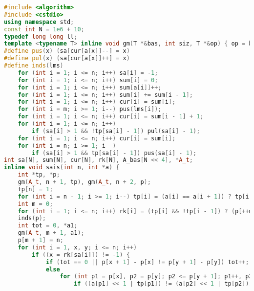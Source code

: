 \documentclass[9pt, a4paper, oneside]{book}
\begin{document}
\begin{lstlisting}[language={C++}]
#include <algorithm>
#include <cstdio>
using namespace std;
const int N = 1e6 + 10;
typedef long long ll;
template <typename T> inline void gm(T *&bas, int siz, T *&op) { op = bas, bas += siz; }
#define pus(x) (sa[cur[a[x]]--] = x)
#define pul(x) (sa[cur[a[x]]++] = x)
#define inds(lms)                                                                                                      \
    for (int i = 1; i <= n; i++) sa[i] = -1;                                                                           \
    for (int i = 1; i <= n; i++) sum[i] = 0;                                                                           \
    for (int i = 1; i <= n; i++) sum[a[i]]++;                                                                          \
    for (int i = 1; i <= n; i++) sum[i] += sum[i - 1];                                                                 \
    for (int i = 1; i <= n; i++) cur[i] = sum[i];                                                                      \
    for (int i = m; i >= 1; i--) pus(lms[i]);                                                                          \
    for (int i = 1; i <= n; i++) cur[i] = sum[i - 1] + 1;                                                              \
    for (int i = 1; i <= n; i++)                                                                                       \
        if (sa[i] > 1 && !tp[sa[i] - 1]) pul(sa[i] - 1);                                                               \
    for (int i = 1; i <= n; i++) cur[i] = sum[i];                                                                      \
    for (int i = n; i >= 1; i--)                                                                                       \
        if (sa[i] > 1 && tp[sa[i] - 1]) pus(sa[i] - 1);
int sa[N], sum[N], cur[N], rk[N], A_bas[N << 4], *A_t;
inline void sais(int n, int *a) {
    int *tp, *p;
    gm(A_t, n + 1, tp), gm(A_t, n + 2, p);
    tp[n] = 1;
    for (int i = n - 1; i >= 1; i--) tp[i] = (a[i] == a[i + 1]) ? tp[i + 1] : (a[i] < a[i + 1]);
    int m = 0;
    for (int i = 1; i <= n; i++) rk[i] = (tp[i] && !tp[i - 1]) ? (p[++m] = i, m) : -1;
    inds(p);
    int tot = 0, *a1;
    gm(A_t, m + 1, a1);
    p[m + 1] = n;
    for (int i = 1, x, y; i <= n; i++)
        if ((x = rk[sa[i]]) != -1) {
            if (tot == 0 || p[x + 1] - p[x] != p[y + 1] - p[y]) tot++;
            else
                for (int p1 = p[x], p2 = p[y]; p2 <= p[y + 1]; p1++, p2++)
                    if ((a[p1] << 1 | tp[p1]) != (a[p2] << 1 | tp[p2])) {

\end{lstlisting}
\end{document}
